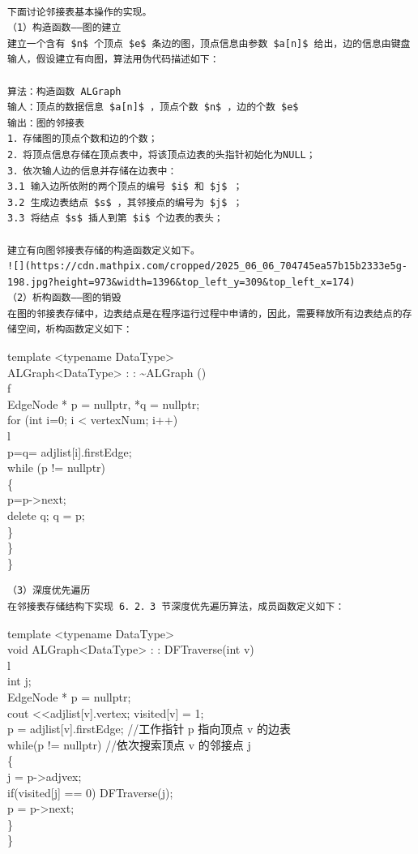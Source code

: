 \documentclass[10pt]{article}
\begin{document}
\begin{verbatim}

下面讨论邻接表基本操作的实现。
（1）构造函数——图的建立
建立一个含有 $n$ 个顶点 $e$ 条边的图，顶点信息由参数 $a[n]$ 给出，边的信息由键盘输人，假设建立有向图，算法用伪代码描述如下：

算法：构造函数 ALGraph
输人：顶点的数据信息 $a[n]$ ，顶点个数 $n$ ，边的个数 $e$
输出：图的邻接表
1．存储图的顶点个数和边的个数；
2．将顶点信息存储在顶点表中，将该顶点边表的头指针初始化为NULL；
3．依次输人边的信息并存储在边表中：
3.1 输入边所依附的两个顶点的编号 $i$ 和 $j$ ；
3.2 生成边表结点 $s$ ，其邻接点的编号为 $j$ ；
3.3 将结点 $s$ 插人到第 $i$ 个边表的表头；

建立有向图邻接表存储的构造函数定义如下。
![](https://cdn.mathpix.com/cropped/2025_06_06_704745ea57b15b2333e5g-198.jpg?height=973&width=1396&top_left_y=309&top_left_x=174)
（2）析构函数——图的销毁
在图的邻接表存储中，边表结点是在程序运行过程中申请的，因此，需要释放所有边表结点的存储空间，析构函数定义如下：
\end{verbatim}

template <typename DataType>\\
ALGraph<DataType> : : \~{}ALGraph ()\\
f\\
EdgeNode * p = nullptr, *q = nullptr;\\
for (int i=0; i < vertexNum; i++)\\
l\\[0pt]
p=q= adjlist[i].firstEdge;\\
while (p != nullptr)\\
\{\\
p=p->next;\\
delete q; q = p;\\
\}\\
\}\\
\}

\begin{verbatim}
（3）深度优先遍历
在邻接表存储结构下实现 6．2．3 节深度优先遍历算法，成员函数定义如下：
\end{verbatim}

template <typename DataType>\\
void ALGraph<DataType> : : DFTraverse(int v)\\
l\\
int j;\\
EdgeNode * p = nullptr;\\[0pt]
cout <<adjlist[v].vertex; visited[v] = 1;\\[0pt]
p = adjlist[v].firstEdge; //工作指针 p 指向顶点 v 的边表\\
while(p != nullptr) //依次搜索顶点 v 的邻接点 j\\
\{\\
j = p->adjvex;\\[0pt]
if(visited[j] == 0) DFTraverse(j);\\
p = p->next;\\
\}\\
\}
\end{document}
